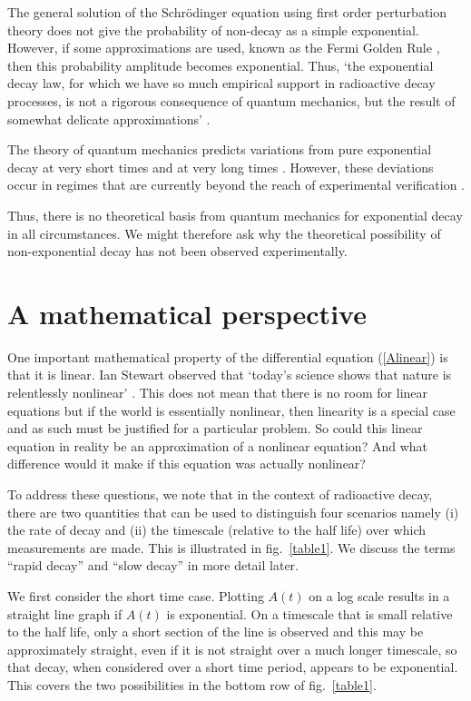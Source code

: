 \documentclass[12pt]{article}
\renewcommand{\Ref}[1]{(\ref{#1})}
\begin{document}
The general solution of the Schr\"odinger equation using first order
perturbation theory does not give the probability of non-decay as
a simple exponential. However, if some
approximations are used, known as the Fermi Golden Rule 
\cite{fonda78,merzbacher98}, then this probability amplitude becomes
exponential. Thus, `the exponential
decay law, for which we have so much empirical support in radioactive decay
processes, is not a rigorous consequence of quantum mechanics, but the
result of somewhat delicate approximations' \cite[p513]{merzbacher98}.

The theory of quantum mechanics predicts variations from pure exponential 
decay at very short times and at very long times \cite{peres80}. However,
these deviations occur in regimes that are currently beyond the reach of
experimental verification \cite{norman88}.

Thus, there is no
theoretical basis from quantum mechanics for exponential decay in
all circumstances. We might therefore ask why the theoretical possibility
of non-exponential decay has not been observed experimentally.


\section{A mathematical perspective}
\label{maths}

One important mathematical property of the differential equation 
\Ref{Alinear} is that it is linear. Ian Stewart observed that `today's 
science shows that nature is relentlessly nonlinear' \cite[p83]{stewart02}. 
This does not mean that there is no room for linear equations
but if the world is essentially nonlinear, then linearity is 
a special case and as such must be justified for a particular problem. 
So could this linear equation in reality be an approximation of
a nonlinear equation? And what difference would it make if this equation
was actually nonlinear?

To address these questions, we note that in the context of radioactive decay, 
there are two quantities that can be used to distinguish four scenarios
namely (i) the rate of decay and (ii) the timescale (relative
to the half life) over which measurements are made. This is illustrated in 
fig.~\ref{table1}. We discuss the terms ``rapid decay'' and 
``slow decay'' in more detail later.

We first consider the short time case. Plotting $A(t)$ on 
a log scale results in a straight line graph if $A(t)$ is exponential.
On a timescale that is small relative to the half life, only a short section 
of the line is observed and this may be approximately straight, 
even if it is not straight over a much longer timescale, so that decay,
when considered over a short time period, appears to be exponential. This 
covers the two possibilities in the bottom row of fig.~\ref{table1}.
\end{document}
